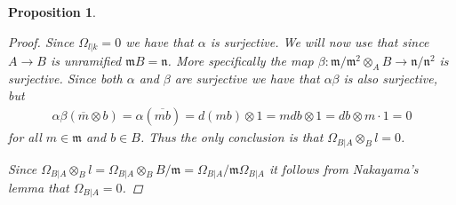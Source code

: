\documentclass[11pt, a4paper, english]{article}
\newtheorem{prop}[theorem]{Proposition}
\theoremstyle{definition}
\begin{document}
\begin{prop}
\begin{proof}
Since $\Omega_{l|k}=0$ we have that $\alpha$ is surjective. We will now use that since $A \to B$ is unramified $\mathfrak{m}B = \mathfrak{n}$. More specifically the map $\beta: \mathfrak{m}/\mathfrak{m}^2 \otimes_A B \to \mathfrak{n}/\mathfrak{n}^2$ is surjective. Since both $\alpha$ and $\beta$ are surjective we have that $\alpha\beta$ is also surjective, but
\begin{align*}
\alpha\beta(\overline{m} \otimes b) = \alpha(\overline{mb}) = d(mb) \otimes 1 = mdb \otimes 1 = db \otimes m \cdot 1 = 0
\end{align*}
for all $m \in \mathfrak{m}$ and $b \in B$. Thus the only conclusion is that $\Omega_{B|A} \otimes_B l = 0$.

Since $\Omega_{B|A} \otimes_B l = \Omega_{B|A} \otimes_B B/\mathfrak{m} = \Omega_{B|A}/\mathfrak{m}\Omega_{B|A}$ it follows from Nakayama's lemma \cite[\href{https://stacks.math.columbia.edu/tag/07RC}{Tag 07RC}]{stacks-project} that $\Omega_{B|A}=0$.
\end{proof}
\end{prop}
\end{document}
